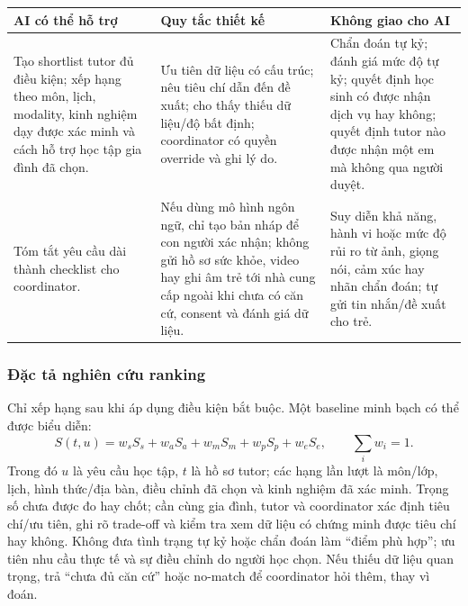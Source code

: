 \documentclass[11pt,a4paper]{article}
\begin{document}
\begin{tabularx}{\textwidth}{p{3.2cm}Y Y}
\toprule
\textbf{AI có thể hỗ trợ} & \textbf{Quy tắc thiết kế} & \textbf{Không giao cho
AI} \\
\midrule
Tạo shortlist tutor đủ điều kiện; xếp hạng theo môn, lịch, modality, kinh
nghiệm dạy được xác minh và cách hỗ trợ học tập gia đình đã chọn. &
Ưu tiên dữ liệu có cấu trúc; nêu tiêu chí dẫn đến đề xuất; cho thấy thiếu dữ
liệu/độ bất định; coordinator có quyền override và ghi lý do. &
Chẩn đoán tự kỷ; đánh giá mức độ tự kỷ; quyết định học sinh có được nhận dịch
vụ hay không; quyết định tutor nào được nhận một em mà không qua người duyệt. \\
Tóm tắt yêu cầu dài thành checklist cho coordinator. &
Nếu dùng mô hình ngôn ngữ, chỉ tạo bản nháp để con người xác nhận; không gửi
hồ sơ sức khỏe, video hay ghi âm trẻ tới nhà cung cấp ngoài khi chưa có căn cứ,
consent và đánh giá dữ liệu. &
Suy diễn khả năng, hành vi hoặc mức độ rủi ro từ ảnh, giọng nói, cảm xúc hay
nhãn chẩn đoán; tự gửi tin nhắn/đề xuất cho trẻ. \\
\bottomrule
\end{tabularx}

\subsubsection{Đặc tả nghiên cứu ranking}

Chỉ xếp hạng sau khi áp dụng điều kiện bắt buộc. Một baseline minh bạch có thể
được biểu diễn:
\[
S(t,u)=w_sS_s+w_aS_a+w_mS_m+w_pS_p+w_eS_e,
\qquad \sum_i w_i=1.
\]
Trong đó $u$ là yêu cầu học tập, $t$ là hồ sơ tutor; các hạng lần lượt là
môn/lớp, lịch, hình thức/địa bàn, điều chỉnh đã chọn và kinh nghiệm đã xác
minh. Trọng số chưa được đo hay chốt; cần cùng gia đình, tutor và coordinator
xác định tiêu chí/ưu tiên,
ghi rõ trade-off và kiểm tra xem dữ liệu có chứng minh được tiêu chí hay không.
Không đưa tình trạng tự kỷ hoặc chẩn đoán làm “điểm phù hợp”; ưu tiên nhu cầu
thực tế và sự điều chỉnh do người học chọn. Nếu thiếu dữ liệu quan trọng, trả
“chưa đủ căn cứ” hoặc no-match để coordinator hỏi thêm, thay vì đoán.
\end{document}
